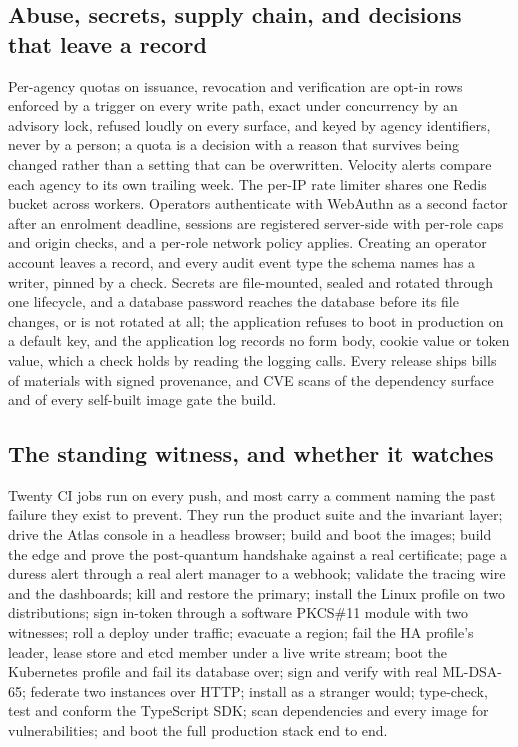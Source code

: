 \subsection{Abuse, secrets, supply chain, and decisions that leave a record}

Per-agency quotas on issuance, revocation and verification are opt-in rows enforced by a trigger on
every write path, exact under concurrency by an advisory lock, refused loudly on every surface, and
keyed by agency identifiers, never by a person; a quota is a decision with a
reason that survives being changed rather than a setting that can be overwritten. Velocity alerts
compare each agency to its own trailing week. The per-IP rate limiter shares one Redis bucket across
workers. Operators authenticate with WebAuthn as a second factor after an enrolment deadline,
sessions are registered server-side with per-role caps and origin checks, and a per-role network
policy applies. Creating an operator account leaves a record, and every audit event type the schema names has a
writer, pinned by a check. Secrets are file-mounted, sealed and rotated through one
lifecycle, and a database password reaches the database before its file changes, or is not rotated at
all; the application refuses to boot in production on a default key, and the application log
records no form body, cookie value or token value, which a check holds by reading the logging
calls. Every release ships bills of materials with
signed provenance, and CVE scans of the dependency surface and of every self-built image gate the
build. \sImpl

\subsection{The standing witness, and whether it watches}

Twenty CI jobs run on every push, and most carry a comment naming the past failure they exist to
prevent. They run the product suite and the invariant layer; drive the Atlas console in a headless
browser; build and boot the images; build the edge and prove the post-quantum handshake against a
real certificate; page a duress alert through a real alert manager to a webhook; validate the
tracing wire and the dashboards; kill and restore the primary; install the Linux profile on two
distributions; sign in-token through a software PKCS\#11 module with two witnesses; roll a deploy
under traffic; evacuate a region; fail the HA profile's leader, lease store and etcd member under a
live write stream; boot the Kubernetes profile and fail its database over; sign and verify with real
ML-DSA-65; federate two instances over HTTP; install  as a stranger would; type-check,
test and conform the TypeScript SDK; scan dependencies and every image for vulnerabilities; and boot
the full production stack end to end. \sImpl

